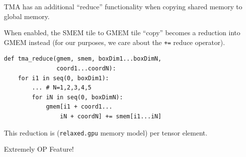 \begin{minipage}[t]{0.5\textwidth}\fixminipage
TMA has an additional ``reduce'' functionality when copying shared memory to global memory.

When enabled, the SMEM tile to GMEM tile ``copy'' becomes a reduction into GMEM instead (for our purposes, we care about the \texttt{+=} reduce operator).

\begin{verbatim}
def tma_reduce(gmem, smem, boxDim1...boxDimN,
               coord1...coordN):
    for i1 in seq(0, boxDim1):
        ... # N=1,2,3,4,5
        for iN in seq(0, boxDimN):
            gmem[i1 + coord1...
                iN + coordN] += smem[i1...iN]
\end{verbatim}

This reduction is  (\texttt{relaxed.gpu} memory model) per tensor element.

Extremely OP Feature!

\end{minipage}
\hfill
